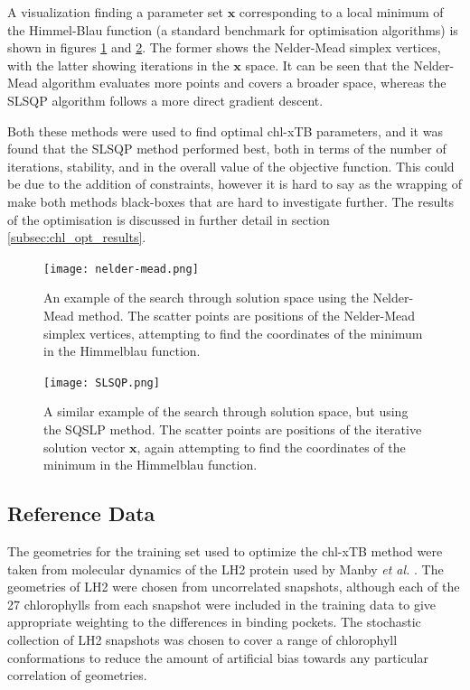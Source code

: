 A visualization finding a parameter set $\mathbf{x}$ corresponding to a local minimum
of the Himmel-Blau function \cite{Himmelblau1972} (a standard benchmark for optimisation 
algorithms) is shown in figures \ref{fig:nelder_mead} and \ref{fig:slsqp}. The former 
shows the Nelder-Mead simplex vertices, with the latter showing iterations in the 
$\mathbf{x}$ space. It can be seen that the Nelder-Mead algorithm evaluates more
points and covers a broader space, whereas the SLSQP algorithm follows a more direct
gradient descent. 

Both these methods were used to find optimal chl-xTB parameters, and it was found 
that the SLSQP method performed best, both in terms of the number of iterations,
stability, and in the overall value of the objective function. This could be due 
to the addition of constraints, however it is hard to say as the wrapping of 
make both methods black-boxes that are hard to investigate further. The results
of the optimisation is discussed in further detail in section \ref{subsec:chl_opt_results}.

\begin{figure}
    \centering
    \texttt{[image: nelder-mead.png]}
    \caption{An example of the search through solution space using the Nelder-Mead
    method. The scatter points are positions of the Nelder-Mead simplex vertices,
    attempting to find the coordinates of the minimum in the Himmelblau function.}
    \label{fig:nelder_mead}
\end{figure}

\begin{figure}
    \centering
    \texttt{[image: SLSQP.png]}
    \caption{A similar example of the search through solution space, but using the
    SQSLP method. The scatter points are positions of the iterative solution vector
    $\mathbf{x}$, again attempting to find the coordinates of the minimum in the 
    Himmelblau function.}
    \label{fig:slsqp}
\end{figure}

\subsection{Reference Data}
\label{subsec:ref_data}
The geometries for the training set used to optimize the chl-xTB method were taken
from molecular dynamics of the LH2 protein used by Manby \emph{et al.} \cite{Stross2016}. 
The geometries of LH2 were chosen from uncorrelated snapshots, although each of
the 27 chlorophylls from each snapshot were included in the training data to give 
appropriate weighting to the differences in binding pockets. The stochastic collection 
of LH2 snapshots was chosen to cover a range of chlorophyll conformations to reduce
the amount of artificial bias towards any particular correlation of geometries.

